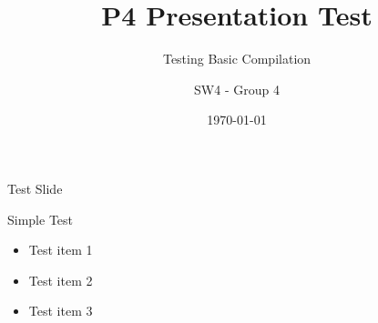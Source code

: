 \documentclass{beamer}
\title{P4 Presentation Test}
\subtitle{Testing Basic Compilation}
\author{SW4 - Group 4}
\date{\today}
\begin{document}
\frame{\titlepage}

\begin{frame}{Test Slide}
\begin{block}{Simple Test}
\begin{itemize}
    \item Test item 1
    \item Test item 2
    \item Test item 3
\end{itemize}
\end{block}
\end{frame}
\end{document}
